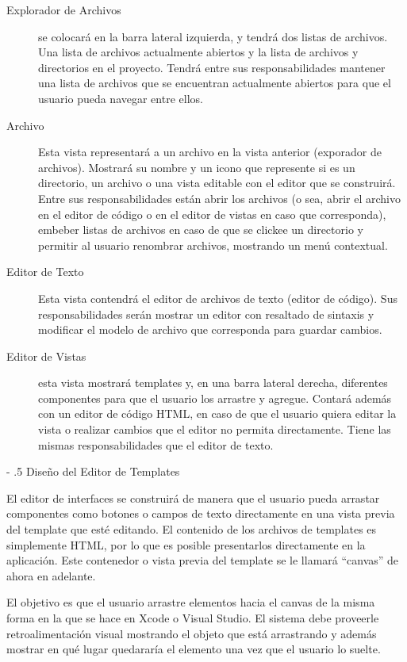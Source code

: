 \documentclass[12pt,titlepage,]{article}
\makeatletter
\renewcommand\paragraph{%
   \@startsection{paragraph}{4}{0mm}%
      {-\baselineskip}%
      {.5\baselineskip}%
      {\normalfont\normalsize\bfseries}}
\makeatother
\begin{document}
\begin{description}
\item[Explorador de Archivos]
se colocará en la barra lateral izquierda, y tendrá dos listas de
archivos. Una lista de archivos actualmente abiertos y la lista de
archivos y directorios en el proyecto. Tendrá entre sus
responsabilidades mantener una lista de archivos que se encuentran
actualmente abiertos para que el usuario pueda navegar entre ellos.
\item[Archivo]
Esta vista representará a un archivo en la vista anterior (exporador de
archivos). Mostrará su nombre y un icono que represente si es un
directorio, un archivo o una vista editable con el editor que se
construirá. Entre sus responsabilidades están abrir los archivos (o sea,
abrir el archivo en el editor de código o en el editor de vistas en caso
que corresponda), embeber listas de archivos en caso de que se clickee
un directorio y permitir al usuario renombrar archivos, mostrando un
menú contextual.
\item[Editor de Texto]
Esta vista contendrá el editor de archivos de texto (editor de código).
Sus responsabilidades serán mostrar un editor con resaltado de sintaxis
y modificar el modelo de archivo que corresponda para guardar cambios.
\item[Editor de Vistas]
esta vista mostrará templates y, en una barra lateral derecha,
diferentes componentes para que el usuario los arrastre y agregue.
Contará además con un editor de código HTML, en caso de que el usuario
quiera editar la vista o realizar cambios que el editor no permita
directamente. Tiene las mismas responsabilidades que el editor de texto.
\end{description}

\paragraph{Diseño del Editor de Templates}

El editor de interfaces se construirá de manera que el usuario pueda
arrastar componentes como botones o campos de texto directamente en una
vista previa del template que esté editando. El contenido de los
archivos de templates es simplemente HTML, por lo que es posible
presentarlos directamente en la aplicación. Este contenedor o vista
previa del template se le llamará ``canvas'' de ahora en adelante.

El objetivo es que el usuario arrastre elementos hacia el canvas de la
misma forma en la que se hace en Xcode o Visual Studio. El sistema debe
proveerle retroalimentación visual mostrando el objeto que está
arrastrando y además mostrar en qué lugar quedararía el elemento una vez
que el usuario lo suelte.
\end{document}
